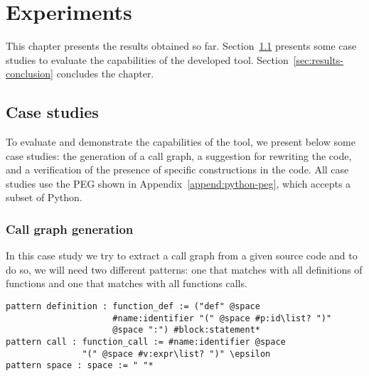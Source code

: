 \chapter{Experiments}\label{chap:results}

This chapter presents the results obtained so far. Section~\ref{sec:case-studies}
presents some case studies to evaluate the capabilities of the developed tool.
Section~\ref{sec:results-conclusion} concludes the chapter.

\section{Case studies}\label{sec:case-studies}

To evaluate and demonstrate the capabilities of the tool, we present below
some case studies: the generation of a call graph, a suggestion for rewriting
the code, and a verification of the presence of specific constructions in the
code. All case studies use the PEG shown in Appendix~\ref{append:python-peg},
which accepts a subset of Python.

\subsection{Call graph generation}

In this case study we try to extract a call graph from a given source code
and to do so, we will need two different patterns: one that matches with all
definitions of functions and one that matches with all functions calls.

\begin{verbatim}
pattern definition : function_def := ("def" @space
                     #name:identifier "(" @space #p:id\list? ")"
                     @space ":") #block:statement*
pattern call : function_call := #name:identifier @space
               "(" @space #v:expr\list? ")" \epsilon
pattern space : space := " "*
\end{verbatim}

